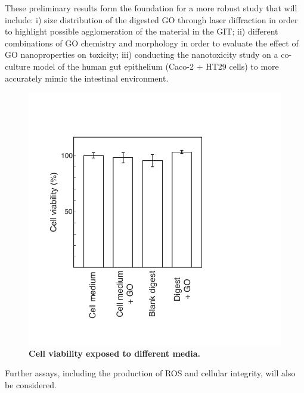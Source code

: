 These preliminary results form the foundation for a more robust study that will include: i) size distribution of the digested GO through laser diffraction in order to highlight possible agglomeration of the material in the GIT; ii) different combinations of GO chemistry and morphology in order to evaluate the effect of GO nanoproperties on toxicity; iii) conducting the nanotoxicity study on a co-culture model of the human gut epithelium (Caco-2 + HT29 cells) to more accurately mimic the intestinal environment.
\begin{figure}[t]
  \centering
  \includegraphics[width=5in]{future/Fig4.pdf}
  \caption{\textbf{Cell viability exposed to different media.}}
  \label{Fig4_fut}
\end{figure}

Further assays, including the production of ROS and cellular integrity, will also be considered.


